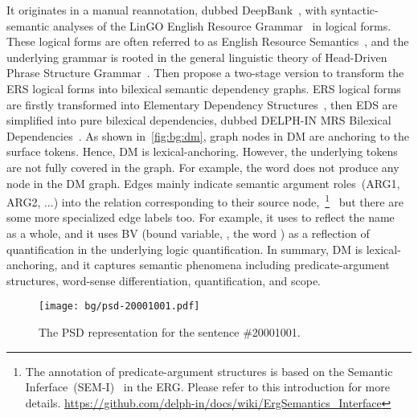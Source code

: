 It originates in a manual reannotation, dubbed
DeepBank~\citep{Fli:Kor:Zha:12}, with syntactic-semantic analyses of
the LinGO English Resource Grammar~\citep{Oep:Fli:Tou:04} in logical
forms. These logical forms are often referred to as English Resource
Semantics~\citep[ERS,][]{Ben:Fli:Oep:15}, and the underlying grammar
is rooted in the general linguistic theory of Head-Driven Phrase
Structure Grammar~\citep[HPSG,][]{Pol:Sag:94}. Then
\citet{Iva:Oep:Ovr:12} propose a two-stage version to transform the
ERS logical forms into bilexical semantic dependency graphs. ERS
logical forms are firstly transformed into Elementary Dependency
Structures~\citep[EDS,][]{Oep:Lon:06}, then EDS are simplified into
pure bilexical dependencies, dubbed DELPH-IN MRS Bilexical
Dependencies~\citep[DM,][]{Iva:Oep:Ovr:12}. As shown
in~\autoref{fig:bg:dm}, graph nodes in DM are anchoring to the surface
tokens. Hence, DM is lexical-anchoring. However, the underlying tokens
are not fully covered in the graph. For example, the word
 does not produce any node in the DM graph. Edges mainly
indicate semantic argument roles~(ARG1, ARG2, ...) into the relation
corresponding to their source node,~\footnote{The annotation of
  predicate-argument structures is based on the Semantic
  Inferface~(SEM-I)~\citep{Fli:Lon:Dyv:05} in the ERG. Please refer to this introduction for
  more
  details. \url{https://github.com/delph-in/docs/wiki/ErgSemantics_Interface}}~
but there are some more specialized edge labels too. For example, it
uses  to reflect the name~ as a
whole, and it uses BV (bound variable, \eg, the word ) as
a reflection of quantification in the underlying logic
quantification. In summary, DM is lexical-anchoring, and it captures
semantic phenomena including predicate-argument structures, word-sense
differentiation, quantification, and scope.

\begin{figure}[!tbp]
\centering
\texttt{[image: bg/psd-20001001.pdf]}
\caption{\label{fig:bg:psd}The PSD representation for the sentence
  \#20001001.}
\end{figure}

